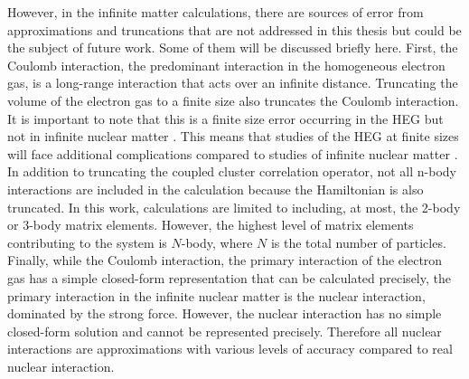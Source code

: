 However, in the infinite matter calculations, there are sources of error from approximations and truncations that are not addressed in this thesis but could be the subject of future work. Some of them will be discussed briefly here. First, the Coulomb interaction, the predominant interaction in the homogeneous electron gas, is a long-range interaction that acts over an infinite distance. Truncating the volume of the electron gas to a finite size also truncates the Coulomb interaction. It is important to note that this is a finite size error occurring in the HEG but not in infinite nuclear matter \cite{Ref4}. This means that studies of the HEG at finite sizes will face additional complications compared to studies of infinite nuclear matter \cite{Ref4}. In addition to truncating the coupled cluster correlation operator, not all n-body interactions are included in the calculation because the Hamiltonian is also truncated. In this work, calculations are limited to including, at most, the 2-body or 3-body matrix elements. However, the highest level of matrix elements contributing to the system is $N$-body, where $N$ is the total number of particles. Finally, while the Coulomb interaction, the primary interaction of the electron gas has a simple closed-form representation that can be calculated precisely, the primary interaction in the infinite nuclear matter is the nuclear interaction, dominated by the strong force. However, the nuclear interaction has no simple closed-form solution and cannot be represented precisely. Therefore all nuclear interactions are approximations with various levels of accuracy compared to real nuclear interaction.


